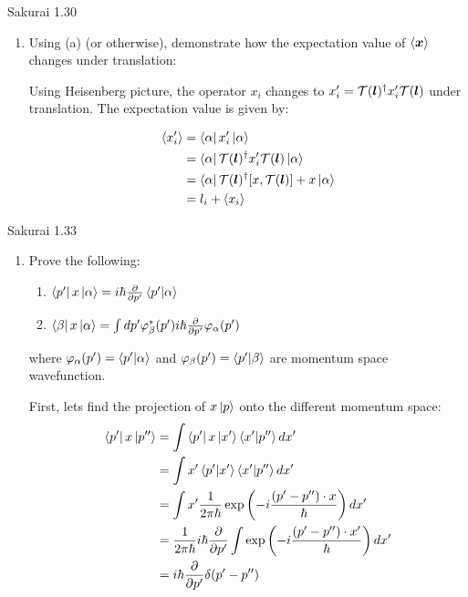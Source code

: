 \documentclass{article}
\begin{document}
\begin{section}{Sakurai 1.30}
\begin{enumerate}
	\item Using (a) (or otherwise), demonstrate how the expectation value of $\left<\boldsymbol{x}\right>$ changes under translation:

	\begin{tcolorbox}
		Using Heisenberg picture, the operator $x_i$ changes to $x_i' = \mathcal{T}(\boldsymbol{l})^\dagger x_i' \mathcal{T}(\boldsymbol{l})$ under translation. The expectation value is given by:

		\begin{align*}
			\left<x_i'\right> & = \bra{\alpha}x_i'\ket{\alpha}                                \\
			            & = \bra{\alpha}\mathcal{T}(\boldsymbol{l})^\dagger x_i' \mathcal{T}(\boldsymbol{l}) \ket{\alpha}     \\
			            & = \bra{\alpha} \mathcal{T}(\boldsymbol{l})^\dagger [x,\mathcal{T}(\boldsymbol{l})] + x \ket{\alpha} \\
			            & = l_i + \left<x_i\right>                                            \\
		\end{align*}
	\end{tcolorbox}
\end{enumerate}

\newpage
\begin{section}{Sakurai 1.33}
\begin{enumerate}
	\item Prove the following:
	\begin{enumerate}
		\item $\bra{p'} x \ket{\alpha} = i \hbar \frac{\partial}{\partial p'} \bra{p'}\ket{\alpha}$
		\item $\bra{\beta}{x}\ket{\alpha} = \int dp' \varphi_\beta^*(p') i\hbar \frac{\partial}{\partial p'} \varphi_\alpha(p')$
	\end{enumerate}

	where $\varphi_{\alpha}(p') = \bra{p'}\ket{\alpha}$ and $\varphi_\beta(p') = \bra{p'}\ket{\beta}$ are momentum space wavefunction.

	\begin{tcolorbox}[breakable]
		First, lets find the projection of $x\ket{p}$ onto the different momentum space:
		\begin{align*}
			\bra{p'}x\ket{p''} & = \int \bra{p'}x\ket{x'} \bra{x'}\ket{p''} dx'                                                                         \\
			                   & = \int x' \bra{p'}\ket{x'} \bra{x'}\ket{p''} dx'                                                                       \\
			                   & = \int x' \frac{1}{2\pi\hbar} \exp \left(-i\frac{(p' -p'')\cdot x}{\hbar}\right) dx'                                   \\
			                   & = \frac{1}{2\pi\hbar} i\hbar \frac{\partial}{\partial p'} \int \exp \left(-i\frac{(p' -p'')\cdot x'}{\hbar}\right) dx' \\
			                   & = i\hbar \frac{\partial}{\partial p'} \delta(p' -p'')
		\end{align*}


\end{tcolorbox}
\end{enumerate}
\end{section}
\end{section}
\end{document}
